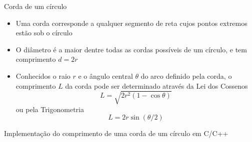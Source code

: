 \begin{frame}[fragile]{Corda de um círculo}

    \begin{itemize}
        \item Uma corda corresponde a qualquer segmento de reta cujos pontos extremos estão sob o círculo
        \pause

        \item O diâmetro é a maior dentre todas as cordas possíveis de um círculo, e tem
            comprimento $d = 2r$
        \pause

        \item Conhecidos o raio $r$ e o ângulo central $\theta$ do arco definido pela corda, 
            o comprimento $L$ da corda pode ser determinado através da Lei dos Cossenos 
        \[
            L = \sqrt{ 2r^2(1 - \cos\theta)}
        \]
        ou pela Trigonometria
        \[
            L = 2r\sin(\theta/2)
        \]

        \begin{figure}
            \centering
        \end{figure}
    \end{itemize}

\end{frame}

\begin{frame}[fragile]{Implementação do comprimento de uma corda de um círculo em C/C++}
\end{frame}

